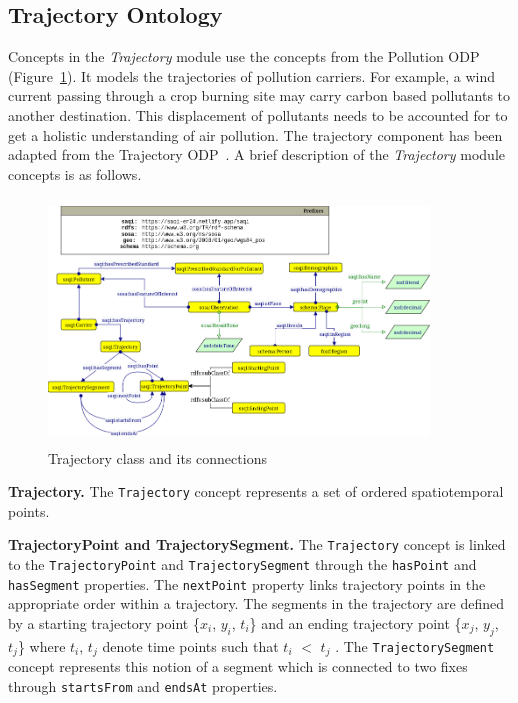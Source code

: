 \subsection{Trajectory Ontology}

Concepts in the \emph{Trajectory} module use the concepts from the Pollution ODP (Figure~\ref{fig:trajectory_concepts}). It models the trajectories of pollution carriers. For example, a wind current passing through a crop burning site may carry carbon based pollutants to another destination. This displacement of pollutants needs to be accounted for to get a holistic understanding of air pollution. The trajectory component has been adapted from the Trajectory ODP~\cite{10.1007/978-3-319-01790-7_24}. A brief description of the \emph{Trajectory} module concepts is as follows.

\begin{figure}[ht]
\centering
\includegraphics[height=6.5cm, width=0.90\textwidth]{figures/ObservationTrajectory.png}
\caption{Trajectory class and its connections} 
\label{fig:trajectory_concepts}
\end{figure}

\textbf{Trajectory.} The \texttt{Trajectory} concept represents a set of ordered spatiotemporal points. 

\textbf{TrajectoryPoint and TrajectorySegment.} The \texttt{Trajectory} concept is linked to the \texttt{TrajectoryPoint} and \texttt{TrajectorySegment} through the \texttt{hasPoint} and \texttt{hasSegment} properties. The \texttt{nextPoint} property links trajectory points in the
appropriate order within a trajectory. The segments in the trajectory are defined by a starting trajectory point \{$x_i$, $y_i$, $t_i$\} and an ending trajectory point \{$x_j$, $y_j$, $t_j$\} where $t_i$, $t_j$ denote time points such that $t_i$ $<$ $t_j$ . The \texttt{TrajectorySegment} concept represents this notion of a segment which is connected to two fixes through \texttt{startsFrom} and \texttt{endsAt} properties.

